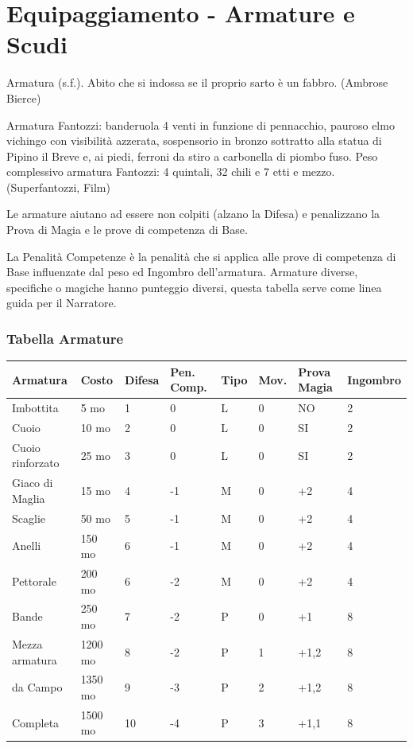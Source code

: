 \section{Equipaggiamento - Armature e Scudi} \hypertarget{equipaggiamento.armature.scudi}{}\label{equipaggiamentoarmature}

\label{equipaggiamento---armature-e-scudi}

\begin{changemargin}{0.3cm}{0.3cm}\begin{enfasi}{
Armatura (s.f.). Abito che si indossa se il proprio sarto è un fabbro. (Ambrose Bierce)

\medskip

Armatura Fantozzi: banderuola 4 venti in funzione di pennacchio, pauroso elmo vichingo con visibilità azzerata, sospensorio in bronzo sottratto alla statua di Pipino il Breve e, ai piedi, ferroni da stiro a carbonella di piombo fuso. Peso complessivo armatura Fantozzi: 4 quintali, 32 chili e 7 etti e mezzo. (Superfantozzi, Film)} \end{enfasi}\end{changemargin}\medskip

Le armature aiutano ad essere non colpiti (alzano la Difesa) e penalizzano la Prova di Magia e le prove di competenza di Base.

La Penalità Competenze è la penalità che si applica alle prove di competenza di Base influenzate dal peso ed Ingombro dell'armatura. Armature diverse, specifiche o magiche hanno punteggio diversi, questa tabella serve come linea guida per il Narratore.

\subsubsection{Tabella Armature}

\label{tabella-armature}
\noindent\begin{tabular}{llllllll}
\textbf{Armatura} & \textbf{Costo} & \textbf{Difesa} & \textbf{Pen. Comp.} & \textbf{Tipo} & \textbf{Mov.} & \textbf{Prova Magia}&\textbf{Ingombro}\\
\toprule
Imbottita & 5 mo & 1 & 0 & L & 0 & NO&2\\
Cuoio & 10 mo & 2 & 0 & L & 0 & SI&2\\
Cuoio rinforzato& 25 mo& 3 & 0& L & 0 & SI&2\\
Giaco di Maglia & 15 mo & 4 & -1 & M & 0 &+2&4\\
Scaglie& 50 mo & 5& -1& M & 0 &+2&4\\
Anelli & 150 mo & 6& -1& M & 0 &+2&4\\
Pettorale& 200 mo & 6& -2& M & 0 &+2&4\\
Bande & 250 mo & 7& -2& P & 0 &+1&8\\
Mezza armatura& 1200 mo& 8& -2& P & 1 &+1,2&8\\
da Campo& 1350 mo& 9& -3& P & 2 &+1,2&8\\
Completa& 1500 mo& 10 & -4& P & 3 &+1,1&8
\end{tabular}

